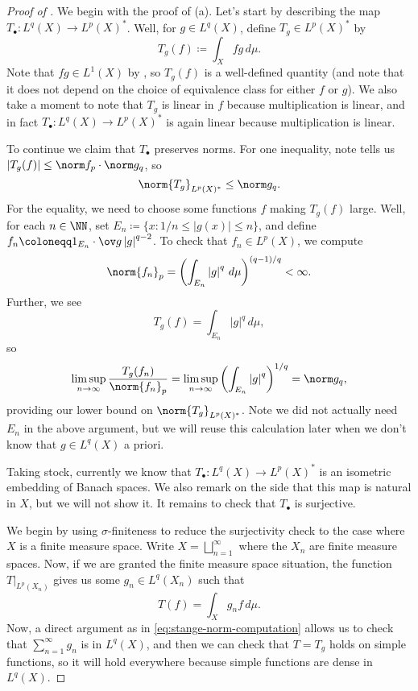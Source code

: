 \documentclass[../notes.tex]{subfiles}
\begin{document}
\begin{proof}[Proof of ]
	We begin with the proof of (a). Let's start by describing the map $T_\bullet\colon L^q(X)\to L^p(X)^*$. Well, for $g\in L^q(X)$, define $T_g\in L^p(X)^*$ by
	\[T_g(f)\coloneqq\int_Xfg\,d\mu.\]
	Note that $fg\in L^1(X)$ by , so $T_g(f)$ is a well-defined quantity (and note that it does not depend on the choice of equivalence class for either $f$ or $g$). We also take a moment to note that $T_g$ is linear in $f$ because multiplication is linear, and in fact $T_\bullet\colon L^q(X)\to L^p(X)^*$ is again linear because multiplication is linear.
	
	To continue we claim that $T_\bullet$ preserves norms. For one inequality, note  tells us $\left|T_g(f)\right|\le\norm f_p\cdot\norm g_q$, so
	\[\norm{T_g}_{L^p(X)^*}\le\norm g_q.\]
	For the equality, we need to choose some functions $f$ making $T_g(f)$ large. Well, for each $n\in\NN$, set $E_n\coloneqq\{x:1/n\le\left|g(x)\right|\le n\}$, and define $f_n\coloneqq 1_{E_n}\cdot\ov g\left|g\right|^{q-2}$. To check that $f_n\in L^p(X)$, we compute
	\[\norm{f_n}_p=\left(\int_{E_n}\left|g\right|^q\,d\mu\right)^{(q-1)/q}<\infty.\]
	Further, we see
	\[T_g(f)=\int_{E_n}\left|g\right|^q\,d\mu,\]
	so
	\begin{equation}
		\limsup_{n\to\infty}\frac{T_g(f_n)}{\norm{f_n}_p}=\limsup_{n\to\infty}\left(\int_{E_n}\left|g\right|^q\right)^{1/q}=\norm g_q, \label{eq:stange-norm-computation}
	\end{equation}
	providing our lower bound on $\norm{T_g}_{L^p(X)^*}$. Note we did not actually need $E_n$ in the above argument, but we will reuse this calculation later when we don't know that $g\in L^q(X)$ a priori.

	Taking stock, currently we know that $T_\bullet\colon L^q(X)\to L^p(X)^*$ is an isometric embedding of Banach spaces. We also remark on the side that this map is natural in $X$, but we will not show it. It remains to check that $T_\bullet$ is surjective.

	We begin by using $\sigma$-finiteness to reduce the surjectivity check to the case where $X$ is a finite measure space. Write $X=\bigsqcup_{n=1}^\infty$ where the $X_n$ are finite measure spaces. Now, if we are granted the finite measure space situation, the function $T|_{L^p(X_n)}$ gives us some $g_n\in L^q(X_n)$ such that
	\[T(f)=\int_Xg_nf\,d\mu.\]
	Now, a direct argument as in \eqref{eq:stange-norm-computation} allows us to check that $\sum_{n=1}^\infty g_n$ is in $L^q(X)$, and then we can check that $T=T_g$ holds on simple functions, so it will hold everywhere because simple functions are dense in $L^q(X)$.


\end{proof}
\end{document}
